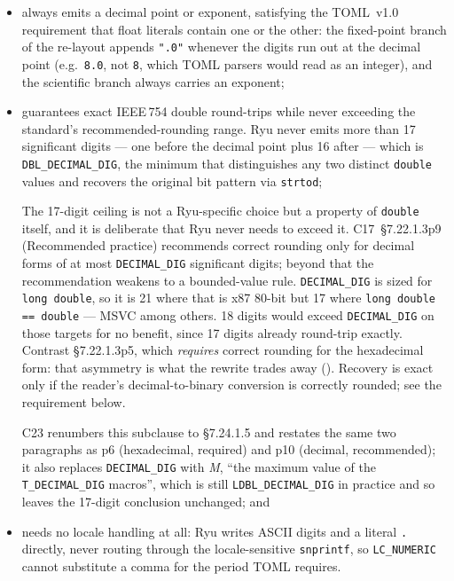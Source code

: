 \documentclass[../RFC-HDFG-2026-001.tex]{subfiles}
\begin{document}
\begin{itemize}
  \item always emits a decimal point or exponent, satisfying the TOML~v1.0
    requirement that float literals contain one or the other: the
    fixed-point branch of the re-layout appends \texttt{".0"} whenever the
    digits run out at the decimal point (e.g.\ \texttt{8.0}, not
    \texttt{8}, which TOML parsers would read as an integer), and the
    scientific branch always carries an exponent;
  \item guarantees exact IEEE\,754 double round-trips while never exceeding
    the standard's recommended-rounding range.  Ryu never emits more than
    17 significant digits --- one before the decimal point plus 16 after ---
    which is \texttt{DBL\_DECIMAL\_DIG}, the minimum that distinguishes any two
    distinct \texttt{double} values and recovers the original bit pattern via
    \texttt{strtod};

    The 17-digit ceiling is not a Ryu-specific choice but a property of
    \texttt{double} itself, and it is deliberate that Ryu never needs to
    exceed it.  C17~\S7.22.1.3p9 (Recommended practice) recommends correct
    rounding only for decimal forms of at most \texttt{DECIMAL\_DIG}
    significant digits; beyond that the recommendation weakens to a
    bounded-value rule.  \texttt{DECIMAL\_DIG} is sized for \texttt{long
    double}, so it is 21 where that is x87 80-bit but 17 where
    \texttt{long double == double} --- MSVC among others.  18 digits would
    exceed \texttt{DECIMAL\_DIG} on those targets for no benefit, since 17
    digits already round-trip exactly.  Contrast \S7.22.1.3p5, which
    \emph{requires} correct rounding for the hexadecimal form: that
    asymmetry is what the rewrite trades away
    ().  Recovery is exact only if the
    reader's decimal-to-binary conversion is correctly rounded; see the
    requirement below.

    C23 renumbers this subclause to \S7.24.1.5 and restates the same two
    paragraphs as p6 (hexadecimal, required) and p10 (decimal, recommended);
    it also replaces \texttt{DECIMAL\_DIG} with \emph{M}, ``the maximum value
    of the \texttt{T\_DECIMAL\_DIG} macros'', which is still
    \texttt{LDBL\_DECIMAL\_DIG} in practice and so leaves the 17-digit
    conclusion unchanged; and
  \item needs no locale handling at all: Ryu writes ASCII digits and a
    literal \texttt{.} directly, never routing through the locale-sensitive
    \texttt{snprintf}, so \texttt{LC\_NUMERIC} cannot substitute a comma for
    the period TOML requires.
\end{itemize}
\end{document}
